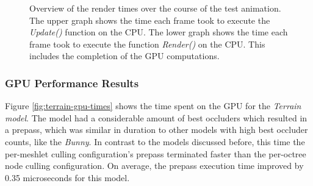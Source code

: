 \begin{figure}[!htb]              %
  \begin{center}
    \caption{Overview of the render times over the course of the test animation. The upper graph shows the time 
    each frame took to execute the \emph{Update()} function on the \ac{CPU}. The lower graph shows the time each 
    frame took to execute the function \emph{Render()} on the \ac{CPU}. This includes the completion of the 
    \ac{GPU} computations.}
    \label{plt:terrain-256-culling-cpu-time}
  \end{center}
\end{figure}

\subsubsection*{GPU Performance Results} \label{subsubsec-gpu-performance-results-terrain}

Figure \ref{fig:terrain-gpu-times} shows the time spent on the \ac{GPU} for the \emph{Terrain model}.
The model had a considerable amount of best occluders which resulted in a prepass, which was similar 
in duration to other models with high best occluder counts, like the \emph{Bunny}. In contrast to 
the models discussed before, this time the per-meshlet culling configuration's prepass terminated faster 
than the per-octree node culling configuration. On average, the prepass execution time improved by 0.35 
microseconds for this model. \\

